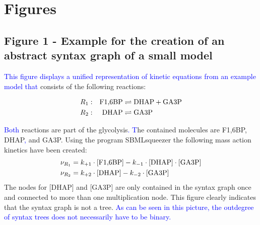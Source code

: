 \documentclass[10pt]{bmc_article}
\newenvironment{bmcformat}{\fussy\setboolean{publ}{true}}{\fussy}
\newcommand{\COR}[1]                      {\textcolor{blue}{#1}}
\begin{document}
\begin{bmcformat}
\newpage
{
   }     %





\section*{Figures}

\subsection*{Figure 1 - Example for the creation of an abstract syntax graph of a small model}
\COR{This figure displays a unified representation of kinetic equations from an example model that} consists of the following reactions:
\begin{center}
\parbox[c]{.35\textwidth}{\begin{align*}
R_{1}&:& \textnormal{F1,6BP} &\rightleftharpoons \ce{DHAP} + \textnormal{GA3P}\\
R_{2}&:& \ce{DHAP}   &\rightleftharpoons \textnormal{GA3P}
\end{align*}}
\end{center}
\COR{Both} reactions are part of the glycolysis\COR{. T}he contained molecules are \acf{F1,6BP},
\acf{DHAP}\COR{,} and \acf{GA3P}.
Using the program SBMLsqueezer \cite{Draeger2008} the following mass action kinetics have been created:
\begin{align*}
\nu_{R_{1}} &= k_{+1} \cdot [\textnormal{F1,6BP}] - k_{-1} \cdot[\ce{DHAP}] \cdot [\textnormal{GA3P}]\\
\nu_{R_{2}} &= k_{+2} \cdot [\ce{DHAP}]           - k_{-2} \cdot[\textnormal{GA3P}]
\end{align*}
The nodes for [DHAP] and [GA3P] are only contained in the syntax graph once and connected to more than one multiplication node.
This figure clearly indicates that the syntax graph is not a tree.
\COR{As can be seen in this picture, the outdegree of syntax trees does not necessarily have to be binary.}


\end{bmcformat}
\end{document}
